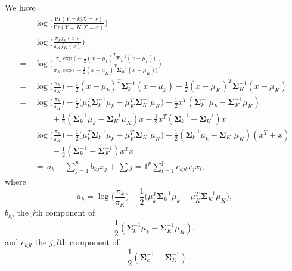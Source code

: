 We have
\begin{equation*}
    \begin{split}
        &\log{\biggl(\frac{\text{Pr}(Y = k \vert X = x)}{\text{Pr}(Y = K \vert X = x)}\biggr)} \\
        =\, &\log{\biggl(\frac{\pi_k f_k(x)}{\pi_K f_K(x)}\biggr)} \\
        =\, &\log{\Biggl(\frac{
            \pi_k \exp{\bigl(-\frac{1}{2}{(x - \mu_k)}^T}\mathbf{\Sigma}_k^{-1}(x - \mu_k)\bigr)
        }{
            \pi_K \exp{\bigl(-\frac{1}{2}{(x - \mu_K)}^T}\mathbf{\Sigma}_K^{-1}(x - \mu_K)\bigr)
        }\Biggr)} \\
        =\, &\log{\biggl(\frac{\pi_k}{\pi_K}\biggr)} - \frac{1}{2}{(x - \mu_k)}^T \mathbf{\Sigma}_k^{-1}
            (x - \mu_k) + \frac{1}{2}{(x - \mu_K)}^T \mathbf{\Sigma}_K^{-1} (x - \mu_K) \\
        =\, &\log{\biggl(\frac{\pi_k}{\pi_K}\biggr)} - \frac{1}{2}\bigl(\mu_k^T\mathbf{\Sigma}_k^{-1}\mu_k
            - \mu_K^T\mathbf{\Sigma}_K^{-1}\mu_K\bigr)
            + \frac{1}{2}x^T(\mathbf{\Sigma}_k^{-1}\mu_k - \mathbf{\Sigma}_K^{-1}\mu_K) \\
        &\qquad + \frac{1}{2}(\mathbf{\Sigma}_k^{-1}\mu_k - \mathbf{\Sigma}_K^{-1}\mu_K)x
            - \frac{1}{2}x^T(\mathbf{\Sigma}_k^{-1} - \mathbf{\Sigma}_K^{-1})x \\
        =\, &\log{\biggl(\frac{\pi_k}{\pi_K}\biggr)} - \frac{1}{2}\bigl(\mu_k^T\mathbf{\Sigma}_k^{-1}\mu_k
            - \mu_K^T\mathbf{\Sigma}_K^{-1}\mu_K\bigr)
            + \frac{1}{2}(\mathbf{\Sigma}_k^{-1}\mu_k - \mathbf{\Sigma}_K^{-1}\mu_K)(x^T + x) \\
        &\qquad - \frac{1}{2}(\mathbf{\Sigma}_k^{-1} - \mathbf{\Sigma}_K^{-1})x^Tx \\
        &=\, a_k + \sum_{j=1}^p{b_{kj} x_j} + \sum{j=1}^p{\sum_{l=1}^p{c_{kjl}x_jx_l}},
    \end{split}
\end{equation*}
where
\[
    a_k = \log{\biggl(\frac{\pi_k}{\pi_K}\biggr)} - \frac{1}{2}\bigl(\mu_k^T\mathbf{\Sigma}_k^{-1}\mu_k
            - \mu_K^T\mathbf{\Sigma}_K^{-1}\mu_K\bigr),
\]
$b_{kj}$ the $j$th component of
\[
    \frac{1}{2}(\mathbf{\Sigma}_k^{-1}\mu_k - \mathbf{\Sigma}_K^{-1}\mu_K),
\]
and $c_{kjl}$ the $j,l$th component of
\[
    - \frac{1}{2}(\mathbf{\Sigma}_k^{-1} - \mathbf{\Sigma}_K^{-1}).
\]
